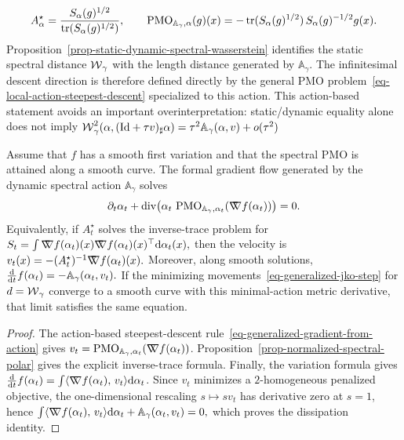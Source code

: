 \[
A_\alpha^\star
=
\frac{S_\alpha(g)^{1/2}}{\operatorname{tr}(S_\alpha(g)^{1/2})},
\qquad
\operatorname{PMO}_{\mathbb A_\gamma,\alpha}(g)(x)
=
-\operatorname{tr}(S_\alpha(g)^{1/2})\,S_\alpha(g)^{-1/2}g(x).
\]
Proposition~\ref{prop-static-dynamic-spectral-wasserstein} identifies the static spectral distance $\operatorname{\mathcal{W}}_\gamma$ with the length distance generated by $\mathbb A_\gamma$. The infinitesimal descent direction is therefore defined directly by the general PMO problem~\eqref{eq-local-action-steepest-descent} specialized to this action. This action-based statement avoids an important overinterpretation: static/dynamic equality alone does not imply
\(\operatorname{\mathcal{W}}_\gamma^2(\alpha,(\mathrm{Id}+\tau v)_\sharp\alpha)=\tau^2\mathbb A_\gamma(\alpha,v)+o(\tau^2)\)
\begin{prop}\label{prop-normalized-spectral-gradient-flow}
Assume that $f$ has a smooth first variation and that the spectral PMO is attained along a smooth curve. The formal gradient flow generated by the dynamic spectral action $\mathbb A_\gamma$ solves
\begin{equation}\label{eq-normalized-spectral-flow}
\partial_t\alpha_t
+
\operatorname{div}\!\left(
\alpha_t\,\operatorname{PMO}_{\mathbb A_\gamma,\alpha_t}(\mathord{\nabla\mkern-9.3mu\nabla} f(\alpha_t))
\right)=0.
\end{equation}
Equivalently, if $A_t^\star$ solves the inverse-trace problem for
\(S_t=\int \mathord{\nabla\mkern-9.3mu\nabla} f(\alpha_t)(x)\mathord{\nabla\mkern-9.3mu\nabla} f(\alpha_t)(x)^\top\mathrm{d}\alpha_t(x),\)
then the velocity is \(v_t(x)=-(A_t^\star)^{-1}\mathord{\nabla\mkern-9.3mu\nabla} f(\alpha_t)(x).\)
Moreover, along smooth solutions, \(\frac{\mathrm{d}}{\mathrm{d} t}f(\alpha_t) = -\mathbb A_\gamma(\alpha_t,v_t).\)
If the minimizing movements~\eqref{eq-generalized-jko-step} for $d=\operatorname{\mathcal{W}}_\gamma$ converge to a smooth curve with this minimal-action metric derivative, that limit satisfies the same equation.
\end{prop}
\begin{proof}
The action-based steepest-descent rule~\eqref{eq-generalized-gradient-from-action} gives
\(
v_t=\operatorname{PMO}_{\mathbb A_\gamma,\alpha_t}(\mathord{\nabla\mkern-9.3mu\nabla} f(\alpha_t))
\).
Proposition~\ref{prop-normalized-spectral-polar} gives the explicit inverse-trace formula.
Finally, the variation formula gives $\frac{\mathrm{d}}{\mathrm{d} t}f(\alpha_t)=\int\langle \mathord{\nabla\mkern-9.3mu\nabla} f(\alpha_t),\,v_t\rangle\mathrm{d}\alpha_t$. Since $v_t$ minimizes a $2$-homogeneous penalized objective, the one-dimensional rescaling $s\mapsto sv_t$ has derivative zero at $s=1$, hence
\(\int\langle \mathord{\nabla\mkern-9.3mu\nabla} f(\alpha_t),\,v_t\rangle\mathrm{d}\alpha_t + \mathbb A_\gamma(\alpha_t,v_t) =0,\)
which proves the dissipation identity.
\end{proof}
